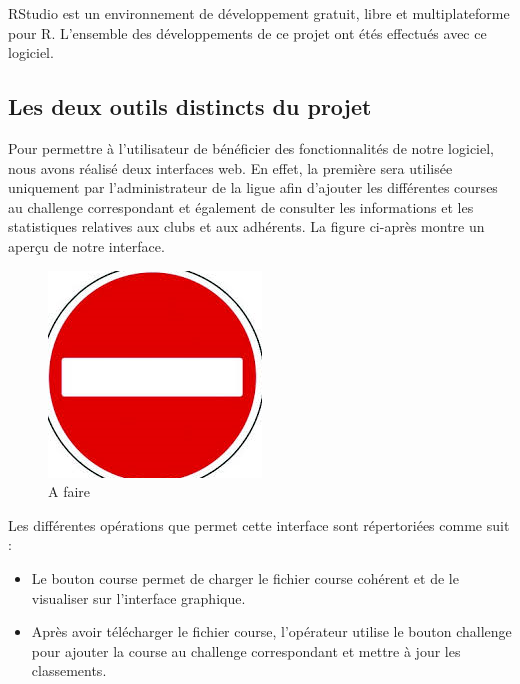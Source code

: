 RStudio est un environnement de développement gratuit, libre et multiplateforme pour R.
L'ensemble des développements de ce projet ont étés effectués avec ce logiciel.



\subsection {Les deux outils distincts du projet}
Pour permettre à l’utilisateur de bénéficier des fonctionnalités de notre logiciel, nous avons réalisé deux interfaces web. En effet, la première sera utilisée uniquement par l’administrateur de la ligue afin d’ajouter les différentes courses au challenge correspondant et également de consulter les informations et les statistiques relatives aux clubs et aux adhérents.
La figure ci-après montre un aperçu de notre interface. 

\begin{figure}
	  \center
	  \includegraphics[scale=0.5]{img/A_faire.png}
	   \caption {A faire }
\end{figure}

Les différentes opérations que permet cette interface sont répertoriées comme suit : 
\begin{itemize} 
\item  Le bouton course permet de charger le fichier course cohérent et de le visualiser sur l’interface graphique.
\item Après avoir télécharger le fichier course, l’opérateur utilise le bouton challenge pour ajouter la course au challenge correspondant et mettre à jour les classements.
\end{itemize} 

